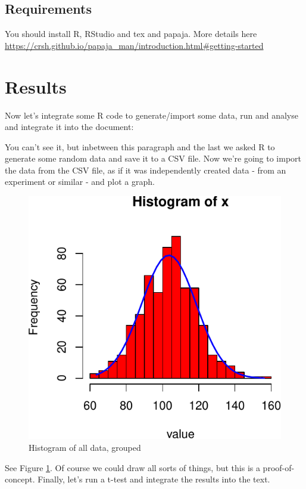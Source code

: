 \documentclass[floatsintext,jou]{apa6}
\theoremstyle{definition}
\theoremstyle{definition}
\theoremstyle{definition}
\theoremstyle{remark}
\begin{document}
\subsection{Requirements}\label{requirements}

You should install R, RStudio and tex and papaja. More details here
\url{https://crsh.github.io/papaja_man/introduction.html\#getting-started}

\section{Results}\label{results}

Now let's integrate some R code to generate/import some data, run and
analyse and integrate it into the document:

You can't see it, but inbetween this paragraph and the last we asked R
to generate some random data and save it to a CSV file. Now we're going
to import the data from the CSV file, as if it was independently created
data - from an experiment or similar - and plot a graph.

\begin{figure}

{\centering \includegraphics[width=0.75\linewidth]{example_manuscript_files/figure-latex/ourhistogram-1} 

}

\caption{Histogram of all data, grouped}\label{fig:ourhistogram}
\end{figure}

See Figure \ref{fig:ourhistogram}. Of course we could draw all sorts of
things, but this is a proof-of-concept. Finally, let's run a t-test and
integrate the results into the text.
\end{document}
